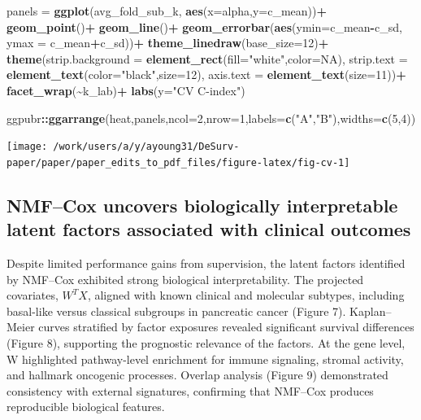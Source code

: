 \documentclass[
]{article}
\newenvironment{Shaded}{\begin{snugshade}}{\end{snugshade}}
\newcommand{\AttributeTok}[1]{\textcolor[rgb]{0.13,0.29,0.53}{#1}}
\newcommand{\ConstantTok}[1]{\textcolor[rgb]{0.56,0.35,0.01}{#1}}
\newcommand{\DecValTok}[1]{\textcolor[rgb]{0.00,0.00,0.81}{#1}}
\newcommand{\FunctionTok}[1]{\textcolor[rgb]{0.13,0.29,0.53}{\textbf{#1}}}
\newcommand{\NormalTok}[1]{#1}
\newcommand{\OtherTok}[1]{\textcolor[rgb]{0.56,0.35,0.01}{#1}}
\newcommand{\SpecialCharTok}[1]{\textcolor[rgb]{0.81,0.36,0.00}{\textbf{#1}}}
\newcommand{\StringTok}[1]{\textcolor[rgb]{0.31,0.60,0.02}{#1}}
\begin{document}
\begin{Shaded}
\begin{Highlighting}[]
\NormalTok{panels }\OtherTok{=} \FunctionTok{ggplot}\NormalTok{(avg\_fold\_sub\_k, }\FunctionTok{aes}\NormalTok{(}\AttributeTok{x=}\NormalTok{alpha,}\AttributeTok{y=}\NormalTok{c\_mean))}\SpecialCharTok{+}
  \FunctionTok{geom\_point}\NormalTok{()}\SpecialCharTok{+}
  \FunctionTok{geom\_line}\NormalTok{()}\SpecialCharTok{+}
  \FunctionTok{geom\_errorbar}\NormalTok{(}\FunctionTok{aes}\NormalTok{(}\AttributeTok{ymin=}\NormalTok{c\_mean}\SpecialCharTok{{-}}\NormalTok{c\_sd, }\AttributeTok{ymax =}\NormalTok{ c\_mean}\SpecialCharTok{+}\NormalTok{c\_sd))}\SpecialCharTok{+}
  \FunctionTok{theme\_linedraw}\NormalTok{(}\AttributeTok{base\_size=}\DecValTok{12}\NormalTok{)}\SpecialCharTok{+}
  \FunctionTok{theme}\NormalTok{(}\AttributeTok{strip.background =} \FunctionTok{element\_rect}\NormalTok{(}\AttributeTok{fill=}\StringTok{"white"}\NormalTok{,}\AttributeTok{color=}\ConstantTok{NA}\NormalTok{),}
        \AttributeTok{strip.text =} \FunctionTok{element\_text}\NormalTok{(}\AttributeTok{color=}\StringTok{"black"}\NormalTok{,}\AttributeTok{size=}\DecValTok{12}\NormalTok{),}
        \AttributeTok{axis.text =} \FunctionTok{element\_text}\NormalTok{(}\AttributeTok{size=}\DecValTok{11}\NormalTok{))}\SpecialCharTok{+}
  \FunctionTok{facet\_wrap}\NormalTok{(}\SpecialCharTok{\textasciitilde{}}\NormalTok{k\_lab)}\SpecialCharTok{+}
  \FunctionTok{labs}\NormalTok{(}\AttributeTok{y=}\StringTok{"CV C{-}index"}\NormalTok{)}

\NormalTok{ggpubr}\SpecialCharTok{::}\FunctionTok{ggarrange}\NormalTok{(heat,panels,}\AttributeTok{ncol=}\DecValTok{2}\NormalTok{,}\AttributeTok{nrow=}\DecValTok{1}\NormalTok{,}\AttributeTok{labels=}\FunctionTok{c}\NormalTok{(}\StringTok{"A"}\NormalTok{,}\StringTok{"B"}\NormalTok{),}\AttributeTok{widths=}\FunctionTok{c}\NormalTok{(}\DecValTok{5}\NormalTok{,}\DecValTok{4}\NormalTok{))}
\end{Highlighting}
\end{Shaded}

\texttt{[image: /work/users/a/y/ayoung31/DeSurv-paper/paper/paper\_edits\_to\_pdf\_files/figure-latex/fig-cv-1]}

\subsection{NMF--Cox uncovers biologically interpretable latent factors
associated with clinical
outcomes}\label{nmfcox-uncovers-biologically-interpretable-latent-factors-associated-with-clinical-outcomes}

Despite limited performance gains from supervision, the latent factors
identified by NMF--Cox exhibited strong biological interpretability. The
projected covariates, \(W^TX\), aligned with known clinical and
molecular subtypes, including basal-like versus classical subgroups in
pancreatic cancer (Figure 7). Kaplan--Meier curves stratified by factor
exposures revealed significant survival differences (Figure 8),
supporting the prognostic relevance of the factors. At the gene level, W
highlighted pathway-level enrichment for immune signaling, stromal
activity, and hallmark oncogenic processes. Overlap analysis (Figure 9)
demonstrated consistency with external signatures, confirming that
NMF--Cox produces reproducible biological features.
\end{document}
